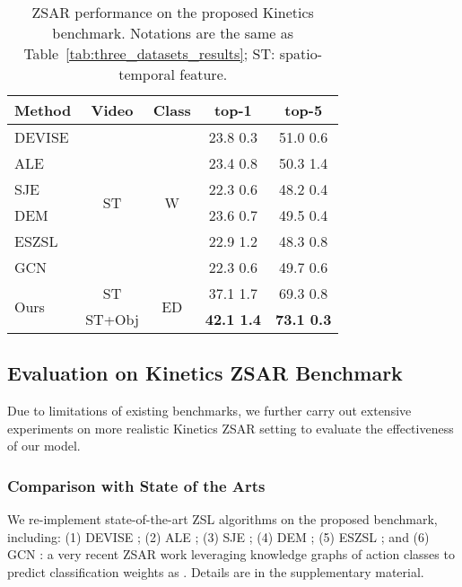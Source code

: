 \begin{table}
	\centering
	\small
	\begin{tabular}{lcccc} \toprule
		Method & Video & Class & top-1 & top-5 \\ \midrule
		DEVISE \cite{frome2013devise} & \multirow{6}{*}{ST} & \multirow{6}{*}{W} & 23.8  0.3 & 51.0  0.6 \\
		ALE \cite{akata2015label} &  &  & 23.4  0.8 & 50.3  1.4 \\
		SJE \cite{akata2015evaluation} &  &  & 22.3  0.6 & 48.2  0.4 \\
		DEM \cite{zhang2017learning} &  &  & 23.6  0.7 & 49.5  0.4 \\
		ESZSL \cite{romera2015embarrassingly} &  &  & 22.9  1.2 & 48.3  0.8 \\
		GCN \cite{ghosh2020all} &  &  & 22.3  0.6 & 49.7  0.6 \\  \midrule
		\multirow{2}{*}{Ours} & ST & \multirow{2}{*}{ED} & 37.1  1.7 & 69.3  0.8 \\
		& ST+Obj &  & \textbf{42.1  1.4} & \textbf{73.1  0.3} \\ \bottomrule
	\end{tabular}
	\caption{ZSAR performance on the proposed Kinetics benchmark. Notations are the same as Table~\ref{tab:three_datasets_results}; ST: spatio-temporal feature.}
	\label{tab:kinetics_sota_cmpr}
\end{table}

\subsection{Evaluation on Kinetics ZSAR Benchmark}
Due to limitations of existing benchmarks, we further carry out extensive experiments on more realistic Kinetics ZSAR setting to evaluate the effectiveness of our model.

\subsubsection{Comparison with State of the Arts}
We re-implement state-of-the-art ZSL algorithms on the proposed benchmark, including:
(1) DEVISE \cite{frome2013devise}; (2) ALE \cite{akata2015label}; (3) SJE \cite{akata2015evaluation}; (4) DEM \cite{zhang2017learning}; (5) ESZSL \cite{romera2015embarrassingly}; and (6) GCN \cite{ghosh2020all}: a very recent ZSAR work leveraging knowledge graphs of action classes to predict classification weights as \cite{wang2018zero}.
Details are in the supplementary material.  

